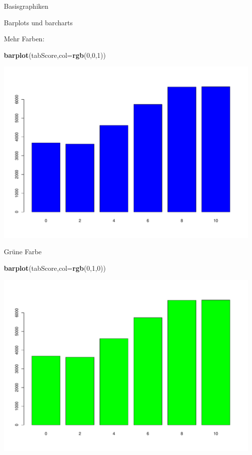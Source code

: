 \documentclass[ignorenonframetext,]{beamer}
\newenvironment{Shaded}{}{}
\newcommand{\KeywordTok}[1]{\textcolor[rgb]{0.00,0.44,0.13}{\textbf{{#1}}}}
\newcommand{\DataTypeTok}[1]{\textcolor[rgb]{0.56,0.13,0.00}{{#1}}}
\newcommand{\DecValTok}[1]{\textcolor[rgb]{0.25,0.63,0.44}{{#1}}}
\newcommand{\NormalTok}[1]{{#1}}
\begin{document}
\begin{frame}[fragile]{Basisgraphiken}
\begin{block}{Barplots und barcharts}
\end{block}

\begin{block}{Mehr Farben:}

\begin{Shaded}
\begin{Highlighting}[]
\KeywordTok{barplot}\NormalTok{(tabScore,}\DataTypeTok{col=}\KeywordTok{rgb}\NormalTok{(}\DecValTok{0}\NormalTok{,}\DecValTok{0}\NormalTok{,}\DecValTok{1}\NormalTok{))}
\end{Highlighting}
\end{Shaded}

\includegraphics{R_intern_files/figure-beamer/unnamed-chunk-156-1.pdf}

\end{block}

\begin{block}{Grüne Farbe}

\begin{Shaded}
\begin{Highlighting}[]
\KeywordTok{barplot}\NormalTok{(tabScore,}\DataTypeTok{col=}\KeywordTok{rgb}\NormalTok{(}\DecValTok{0}\NormalTok{,}\DecValTok{1}\NormalTok{,}\DecValTok{0}\NormalTok{))}
\end{Highlighting}
\end{Shaded}

\includegraphics{R_intern_files/figure-beamer/unnamed-chunk-157-1.pdf}


\end{block}
\end{frame}
\end{document}
